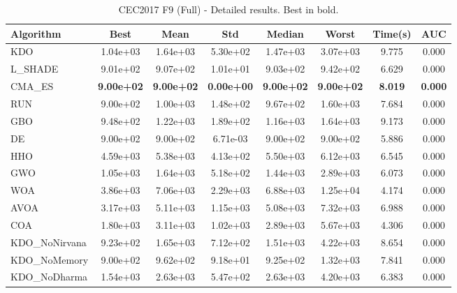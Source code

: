 \begin{table}[H]
\centering\small
\caption{CEC2017 F9 (Full) - Detailed results. Best in bold.}
\label{tab:cec2017_F9}
\begin{tabular}{lccccccc}
\toprule
\textbf{Algorithm} & \textbf{Best} & \textbf{Mean} & \textbf{Std} & \textbf{Median} & \textbf{Worst} & \textbf{Time(s)} & \textbf{AUC} \\
\midrule
KDO & 1.04e+03 & 1.64e+03 & 5.30e+02 & 1.47e+03 & 3.07e+03 & 9.775 & 0.000 \\
L_SHADE & 9.01e+02 & 9.07e+02 & 1.01e+01 & 9.03e+02 & 9.42e+02 & 6.629 & 0.000 \\
CMA_ES & \textbf{9.00e+02} & \textbf{9.00e+02} & \textbf{0.00e+00} & \textbf{9.00e+02} & \textbf{9.00e+02} & \textbf{8.019} & \textbf{0.000} \\
RUN & 9.00e+02 & 1.00e+03 & 1.48e+02 & 9.67e+02 & 1.60e+03 & 7.684 & 0.000 \\
GBO & 9.48e+02 & 1.22e+03 & 1.89e+02 & 1.16e+03 & 1.64e+03 & 9.173 & 0.000 \\
DE & 9.00e+02 & 9.00e+02 & 6.71e-03 & 9.00e+02 & 9.00e+02 & 5.886 & 0.000 \\
HHO & 4.59e+03 & 5.38e+03 & 4.13e+02 & 5.50e+03 & 6.12e+03 & 6.545 & 0.000 \\
GWO & 1.05e+03 & 1.64e+03 & 5.18e+02 & 1.44e+03 & 2.89e+03 & 6.073 & 0.000 \\
WOA & 3.86e+03 & 7.06e+03 & 2.29e+03 & 6.88e+03 & 1.25e+04 & 4.174 & 0.000 \\
AVOA & 3.17e+03 & 5.11e+03 & 1.15e+03 & 5.08e+03 & 7.32e+03 & 6.988 & 0.000 \\
COA & 1.80e+03 & 3.11e+03 & 1.02e+03 & 2.89e+03 & 5.67e+03 & 4.306 & 0.000 \\
KDO_NoNirvana & 9.23e+02 & 1.65e+03 & 7.12e+02 & 1.51e+03 & 4.22e+03 & 8.654 & 0.000 \\
KDO_NoMemory & 9.00e+02 & 9.62e+02 & 9.18e+01 & 9.25e+02 & 1.32e+03 & 7.841 & 0.000 \\
KDO_NoDharma & 1.54e+03 & 2.63e+03 & 5.47e+02 & 2.63e+03 & 4.20e+03 & 6.383 & 0.000 \\
\bottomrule
\end{tabular}
\end{table}

